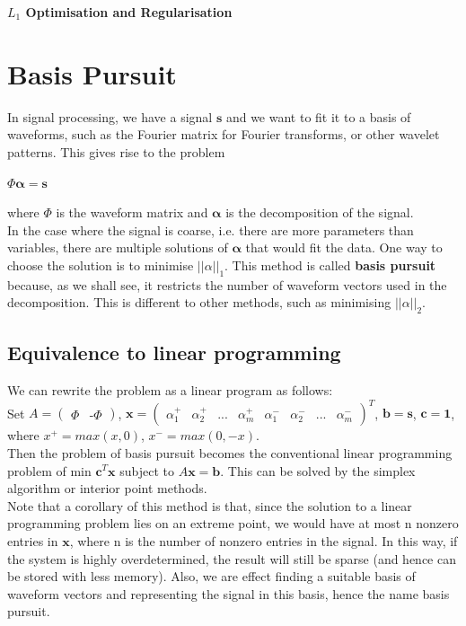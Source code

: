 \documentclass[11pt,a4paper]{article}
\begin{document}
\vspace*{\fill}
\begin{center}
\textbf{{\huge $L_1$ Optimisation and Regularisation}}
\end{center}
\vspace*{\fill}
\pagebreak

\section{Basis Pursuit}
In signal processing, we have a signal $\mathbf{s}$ and we want to fit it to a basis of waveforms, such as the Fourier matrix for Fourier transforms, or other wavelet patterns. This gives rise to the problem
\begin{center} $\Phi \mathbf{\alpha} = \mathbf{s}$ \end{center}
where $\Phi$ is the waveform matrix and $\mathbf{\alpha}$ is the decomposition of the signal. \\
In the case where the signal is coarse, i.e. there are more parameters than variables, there are multiple solutions of $\mathbf{\alpha}$ that would fit the data. One way to choose the solution is to minimise $||\alpha||_1$. This method is called \textbf{basis pursuit} because, as we shall see, it restricts the number of waveform vectors used in the decomposition. This is different to other methods, such as minimising $||\alpha||_2$. \\
\subsection{Equivalence to linear programming}
We can rewrite the problem as a linear program as follows: \\
Set $A = \begin{pmatrix} \Phi & \text{-}\Phi \end{pmatrix}$, $\mathbf{x} = \begin{pmatrix} \alpha_1^+ & \alpha_2^+ & ... & \alpha_m^+ &  \alpha_1^- & \alpha_2^- & ... & \alpha_m^- \end{pmatrix}^T$, $\mathbf{b} = \mathbf{s}$, $\mathbf{c} = \mathbf{1}$, where $x^+ = max(x,0)$, $x^- = max(0,-x)$. \\
Then the problem of basis pursuit becomes the conventional linear programming problem of min $\mathbf{c}^T\mathbf{x}$ subject to $A\mathbf{x} = \mathbf{b}$. This can be solved by the simplex algorithm or interior point methods. \\

Note that a corollary of this method is that, since the solution to a linear programming problem lies on an extreme point, we would have at most n nonzero entries in $\mathbf{x}$, where n is the number of nonzero entries in the signal. In this way, if the system is highly overdetermined, the result will still be sparse (and hence can be stored with less memory). Also, we are effect finding a suitable basis of waveform vectors and representing the signal in this basis, hence the name basis pursuit. \\
\end{document}
